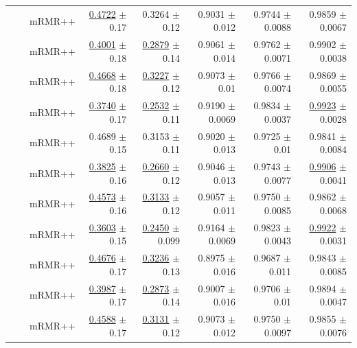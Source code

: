\begin{longtable}{llp{}rrrrr}
 &  & mRMR++ & \underline{0.4722} {\scriptsize $\pm$ 0.17} & 0.3264 {\scriptsize $\pm$ 0.12} & 0.9031 {\scriptsize $\pm$ 0.012} & 0.9744 {\scriptsize $\pm$ 0.0088} & 0.9859 {\scriptsize $\pm$ 0.0067} \\
 &  & mRMR++ & \underline{0.4001} {\scriptsize $\pm$ 0.18} & \underline{0.2879} {\scriptsize $\pm$ 0.14} & 0.9061 {\scriptsize $\pm$ 0.014} & 0.9762 {\scriptsize $\pm$ 0.0071} & 0.9902 {\scriptsize $\pm$ 0.0038} \\
 &  & mRMR++ & \underline{0.4668} {\scriptsize $\pm$ 0.18} & \underline{0.3227} {\scriptsize $\pm$ 0.12} & 0.9073 {\scriptsize $\pm$ 0.01} & 0.9766 {\scriptsize $\pm$ 0.0074} & 0.9869 {\scriptsize $\pm$ 0.0055} \\
 &  & mRMR++ & \underline{0.3740} {\scriptsize $\pm$ 0.17} & \underline{0.2532} {\scriptsize $\pm$ 0.11} & 0.9190 {\scriptsize $\pm$ 0.0069} & 0.9834 {\scriptsize $\pm$ 0.0037} & \underline{0.9923} {\scriptsize $\pm$ 0.0028} \\
 &  & mRMR++ & 0.4689 {\scriptsize $\pm$ 0.15} & 0.3153 {\scriptsize $\pm$ 0.11} & 0.9020 {\scriptsize $\pm$ 0.013} & 0.9725 {\scriptsize $\pm$ 0.01} & 0.9841 {\scriptsize $\pm$ 0.0084} \\
 &  & mRMR++ & \underline{0.3825} {\scriptsize $\pm$ 0.16} & \underline{0.2660} {\scriptsize $\pm$ 0.12} & 0.9046 {\scriptsize $\pm$ 0.013} & 0.9743 {\scriptsize $\pm$ 0.0077} & \underline{0.9906} {\scriptsize $\pm$ 0.0041} \\
 &  & mRMR++ & \underline{0.4573} {\scriptsize $\pm$ 0.16} & \underline{0.3133} {\scriptsize $\pm$ 0.12} & 0.9057 {\scriptsize $\pm$ 0.011} & 0.9750 {\scriptsize $\pm$ 0.0085} & 0.9862 {\scriptsize $\pm$ 0.0068} \\
 &  & mRMR++ & \underline{0.3603} {\scriptsize $\pm$ 0.15} & \underline{0.2450} {\scriptsize $\pm$ 0.099} & 0.9164 {\scriptsize $\pm$ 0.0069} & 0.9823 {\scriptsize $\pm$ 0.0043} & \underline{0.9922} {\scriptsize $\pm$ 0.0031} \\
 &  & mRMR++ & \underline{0.4676} {\scriptsize $\pm$ 0.17} & \underline{0.3236} {\scriptsize $\pm$ 0.13} & 0.8975 {\scriptsize $\pm$ 0.016} & 0.9687 {\scriptsize $\pm$ 0.011} & 0.9843 {\scriptsize $\pm$ 0.0085} \\
 &  & mRMR++ & \underline{0.3987} {\scriptsize $\pm$ 0.17} & \underline{0.2873} {\scriptsize $\pm$ 0.14} & 0.9007 {\scriptsize $\pm$ 0.016} & 0.9706 {\scriptsize $\pm$ 0.01} & 0.9894 {\scriptsize $\pm$ 0.0047} \\
 &  & mRMR++ & \underline{0.4588} {\scriptsize $\pm$ 0.17} & \underline{0.3131} {\scriptsize $\pm$ 0.12} & 0.9073 {\scriptsize $\pm$ 0.012} & 0.9750 {\scriptsize $\pm$ 0.0097} & 0.9855 {\scriptsize $\pm$ 0.0076} \\

\end{longtable}
